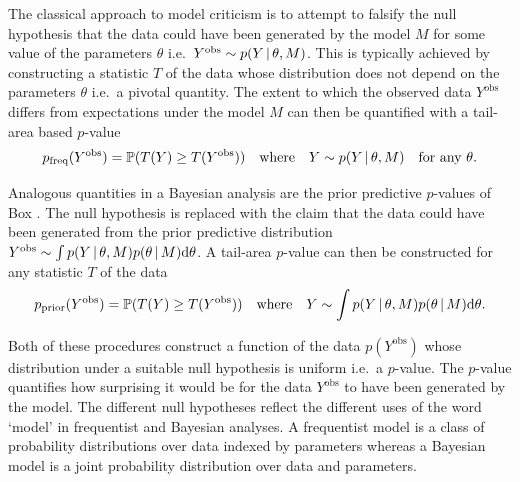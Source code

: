 \documentclass{article} %
\def\ie{i.e.\ }
\begin{document}
The classical approach to model criticism is to attempt to falsify the null hypothesis that the data could have been generated by the model $M$ for some value of the parameters $\theta$ \ie ${Y^\textrm{obs} \sim p(Y \,|\, \theta, M)}$.
This is typically achieved by constructing a statistic $T$ of the data whose distribution does not depend on the parameters $\theta$ \ie a pivotal quantity.
The extent to which the observed data $Y^\textrm{obs}$ differs from expectations under the model $M$ can then be quantified with a tail-area based $p$-value
\vspace{-0.3\baselineskip}
\begin{equation}
  p_\textrm{freq}(Y^\textrm{obs}) = \mathbb{P}(T(Y)\geq T(Y^\textrm{obs})) \quad \textrm{where} \quad Y \sim p(Y \,|\, \theta, M) \quad \textrm{for any } \theta.
  \label{eq:freq-p-value}
\end{equation}

\vspace{-0.5\baselineskip}

Analogous quantities in a Bayesian analysis are the prior predictive $p$-values of Box \citep{Box1980-ud}.
The null hypothesis is replaced with the claim that the data could have been generated from the prior predictive distribution ${Y^\textrm{obs} \sim \int p(Y \,|\, \theta, M)p(\theta \,|\, M) \mathrm{d}\theta}$.
A tail-area $p$-value can then be constructed for any statistic $T$ of the data
\vspace{-0.8\baselineskip}
\begin{equation}
  p_\textrm{prior}(Y^\textrm{obs}) = \mathbb{P}(T(Y)\geq T(Y^\textrm{obs})) \quad \textrm{where} \quad Y \sim \int p(Y \,|\, \theta, M)p(\theta \,|\, M) \mathrm{d}\theta.
  \label{eq:prior-p-value}
\end{equation}

\vspace{-\baselineskip}

Both of these procedures construct a function of the data $p(Y^\textrm{obs})$ whose distribution under a suitable null hypothesis is uniform \ie a $p$-value.
The $p$-value quantifies how surprising it would be for the data $Y^\textrm{obs}$ to have been generated by the model.
The different null hypotheses reflect the different uses of the word `model' in frequentist and Bayesian analyses.
A frequentist model is a class of probability distributions over data indexed by parameters whereas a Bayesian model is a joint probability distribution over data and parameters.
\end{document}
